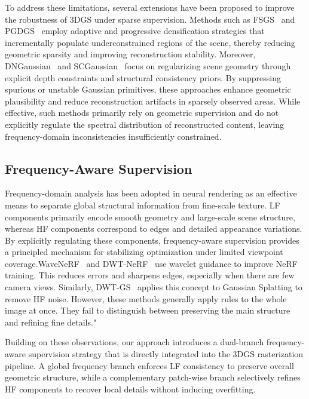 To address these limitations, several extensions have been proposed to improve the robustness of 3DGS under sparse supervision. Methods such as FSGS~\cite{zhu2024fsgs} and PGDGS~\cite{huang2025pgdgs} employ adaptive and progressive densification strategies that incrementally populate underconstrained regions of the scene, thereby reducing geometric sparsity and improving reconstruction stability. Moreover, DNGaussian~\cite{li2024dngaussian} and SCGaussian~\cite{peng2024structure} focus on regularizing scene geometry through explicit depth constraints and structural consistency priors. By suppressing spurious or unstable Gaussian primitives, these approaches enhance geometric plausibility and reduce reconstruction artifacts in sparsely observed areas. While effective, such methods primarily rely on geometric supervision and do not explicitly regulate the spectral distribution of reconstructed content, leaving frequency-domain inconsistencies insufficiently constrained.


\subsection{Frequency-Aware Supervision}

Frequency-domain analysis has been adopted in neural rendering as an effective means to separate global structural information from fine-scale texture. LF components primarily encode smooth geometry and large-scale scene structure, whereas HF components correspond to edges and detailed appearance variations. By explicitly regulating these components, frequency-aware supervision provides a principled mechanism for stabilizing optimization under limited viewpoint coverage.WaveNeRF~\cite{xu2023wavenerf} and DWT-NeRF~\cite{nguyen2025dwtnerf} use wavelet guidance to improve NeRF training. This reduces errors and sharpens edges, especially when there are few camera views. Similarly, DWT-GS~\cite{nguyen2025dwtgsrethinkingfrequencyregularization} applies this concept to Gaussian Splatting to remove HF noise. However, these methods generally apply rules to the whole image at once. They fail to distinguish between preserving the main structure and refining fine details."

Building on these observations, our approach introduces a dual-branch frequency-aware supervision strategy that is directly integrated into the 3DGS rasterization pipeline. A global frequency branch enforces LF consistency to preserve overall geometric structure, while a complementary patch-wise branch selectively refines HF components to recover local details without inducing overfitting. 


